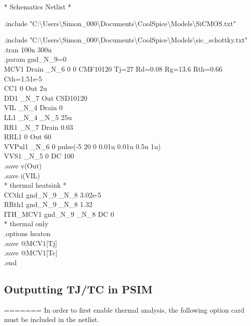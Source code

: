 {\fontsize{10}{12}\selectfont
	* Schematics Netlist * 
	
	.include "C:\textbackslash Users\textbackslash Simon\_000\textbackslash Documents\textbackslash CoolSpice\textbackslash Models\textbackslash SiCMOS.txt"
	
	.include "C:\textbackslash Users\textbackslash Simon\_000\textbackslash Documents\textbackslash CoolSpice\textbackslash Models\textbackslash sic\_schottky.txt" \\
	
	.tran 100n 300u \\
	\indent .param gnd\_N\_9=0 \\
	
	MCV1 Drain \_N\_6 0 0 CMF10120 Tj=27 Rd=0.08 Rg=13.6 Rth=0.66 Cth=1.51e-5 \\
	
	CC1 0 Out 2u \\
	\indent DD1 \_N\_7 Out CSD10120 \\
	\indent VIL \_N\_4 Drain 0 \\
	
	LL1 \_N\_4 \_N\_5 25u \\ 
	\indent RR1 \_N\_7 Drain 0.03 \\
	\indent RRL1 0 Out 60 \\
	
	VVPul1 \_N\_6 0 pulse(-5 20 0 0.01u 0.01u 0.5u 1u) \\
	\indent VVS1 \_N\_5 0 DC 100 \\
	
	.save v(Out) \\
	\indent .save i(VIL) \\
	
	* thermal heatsink * \\
	\indent CCth1 gnd\_N\_9 \_N\_8 3.02e-5 \\
	\indent RRth1 gnd\_N\_9 \_N\_8 1.32 \\
	\indent ITH\_MCV1 gnd\_N\_9 \_N\_8 DC 0 \\
	
	* thermal only \\
	\indent .options heaton \\
	
	.save @MCV1[Tj] \\
	\indent .save @MCV1[Tc] \\
	
	.end
}



\subsection{Outputting TJ/TC in PSIM}
=======
In order to first enable thermal analysis, the following option card must be included in the netlist.

